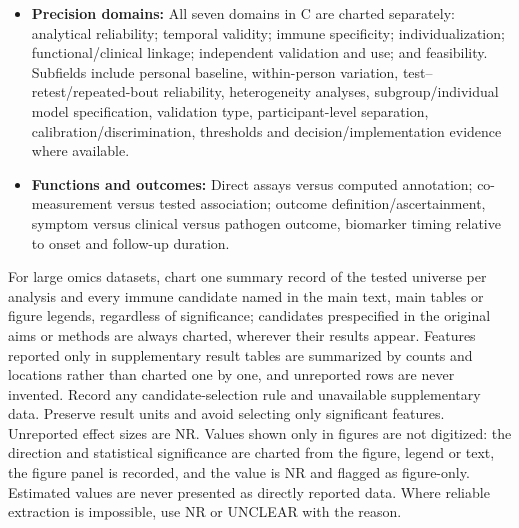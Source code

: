 \documentclass[
  11pt,
  a4paper,
]{article}
\begin{document}
\begin{itemize}
  and never used for eligibility or weighting.
\item
  \textbf{Precision domains:} All seven domains in C are charted
  separately: analytical reliability; temporal validity; immune
  specificity; individualization; functional/clinical linkage;
  independent validation and use; and feasibility. Subfields include
  personal baseline, within-person variation, test--retest/repeated-bout
  reliability, heterogeneity analyses, subgroup/individual model
  specification, validation type, participant-level separation,
  calibration/discrimination, thresholds and decision/implementation
  evidence where available.
\item
  \textbf{Functions and outcomes:} Direct assays versus computed
  annotation; co-measurement versus tested association; outcome
  definition/ascertainment, symptom versus clinical versus pathogen
  outcome, biomarker timing relative to onset and follow-up duration.
\end{itemize}

For large omics datasets, chart one summary record of the tested
universe per analysis and every immune candidate named in the main text,
main tables or figure legends, regardless of significance; candidates
prespecified in the original aims or methods are always charted,
wherever their results appear. Features reported only in supplementary
result tables are summarized by counts and locations rather than charted
one by one, and unreported rows are never invented. Record any
candidate-selection rule and unavailable supplementary data. Preserve
result units and avoid selecting only significant features. Unreported
effect sizes are NR. Values shown only in figures are not digitized: the
direction and statistical significance are charted from the figure,
legend or text, the figure panel is recorded, and the value is NR and
flagged as figure-only. Estimated values are never presented as directly
reported data. Where reliable extraction is impossible, use NR or
UNCLEAR with the reason.
\end{document}

